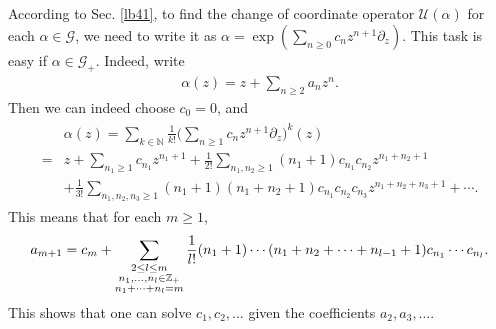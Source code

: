 \documentclass[11pt,b5paper,notitlepage]{article}
\theoremstyle{definition}
\theoremstyle{plain}
\newcommand{\mc}{\mathcal}
\newcommand{\Res}{\mathrm{Res}}
\newcommand{\Cbb}{\mathbb C}
\newcommand{\Nbb}{\mathbb N}
\newcommand{\Zbb}{\mathbb Z}
\numberwithin{equation}{section}
\begin{document}




\subsection{}



According to Sec. \ref{lb41}, to find the change of coordinate operator $\mc U(\alpha)$ for each $\alpha\in\mc G$, we need to write it as $\alpha=\exp(\sum_{n\geq 0}c_n z^{n+1}\partial_z)$. This task is easy if $\alpha\in\mc G_+$. Indeed, write
\begin{align}
\alpha(z)=z+\sum_{n\geq 2}a_nz^n.	
\end{align}
Then we can indeed choose $c_0=0$, and
\begin{align}\label{eq163}
\begin{aligned}
&\alpha(z)=\sum_{k\in\Nbb}\frac 1{k!}\Big(\sum_{n\geq 1}c_n z^{n+1}\partial_z\Big)^k(z)\\
=&z+\sum_{n_1\geq 1}c_{n_1}z^{n_1+1}+\frac 1{2!}\sum_{n_1,n_2\geq 1}(n_1+1)c_{n_1}c_{n_2}z^{n_1+n_2+1}\\
&+\frac 1{3!}\sum_{n_1,n_2,n_3\geq1}(n_1+1)(n_1+n_2+1)c_{n_1}c_{n_2}c_{n_3}z^{n_1+n_2+n_3+1}+\cdots.
\end{aligned}
\end{align}
This means that for each $m\geq 1$,
\begin{align}
a_{m+1}=c_m+\sum_{\begin{subarray}{c}
2\leq l\leq m\\
n_1,\dots,n_l\in\Zbb_+\\
n_1+\cdots+n_l=m		
\end{subarray}}	
\frac 1{l!}(n_1+1)\cdots (n_1+n_2+\cdots +n_{l-1}+1)c_{n_1}\cdots c_{n_l}.\label{eq158}
\end{align}
This shows that one can solve $c_1,c_2,\dots$ given the coefficients $a_2,a_3,\dots$.
\end{document}
